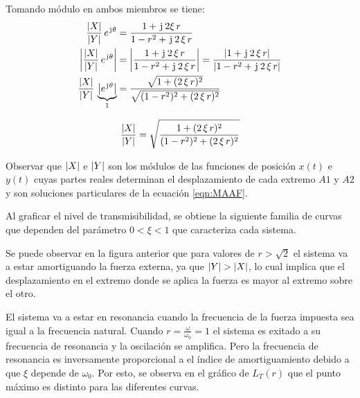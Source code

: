 Tomando módulo en ambos miembros se tiene:
\begin{align*}
    \frac{{\left| {X} \right|}}{{\left| {Y} \right|}} \, e^{\mkern2mu\mathrm{j}\mkern1mu\theta}
    &= \frac{1+ \mkern2mu\mathrm{j}\mkern1mu \, 2 \xi \, r}{1-r^2 + \mkern2mu\mathrm{j}\mkern1mu \, 2 \, \xi \, r}
    \\
    {\left| {\frac{{\left| {X} \right|}}{{\left| {Y} \right|}} \, e^{\mkern2mu\mathrm{j}\mkern1mu\theta}} \right|}
    &= {\left| {\frac{1+ \mkern2mu\mathrm{j}\mkern1mu \, 2 \, \xi \, r}{1-r^2 + \mkern2mu\mathrm{j}\mkern1mu \, 2 \, \xi \, r}} \right|}
    = \frac{{\left| {1 + \mkern2mu\mathrm{j}\mkern1mu \, 2 \, \xi \, r} \right|}}{{\left| {1-r^2 + \mkern2mu\mathrm{j}\mkern1mu \, 2 \, \xi \, r} \right|}}
    \\
    \frac{{\left| {X} \right|}}{{\left| {Y} \right|}} \, \underbrace{{\left| {e^{\mkern2mu\mathrm{j}\mkern1mu\theta}} \right|}}_1
    &= \frac{\sqrt{1 + (2 \, \xi \, r)^2}}{\sqrt{(1-r^2)^2 + (2 \, \xi \, r)^2}}
\end{align*}

\begin{mdframed}[style=PropertyFrame]
    \begin{prop}
    \end{prop}
    \begin{equation*}
        \frac{{\left| {X} \right|}}{{\left| {Y} \right|}} = \sqrt{\frac{1 + (2 \, \xi \, r)^2}{(1-r^2)^2 + (2 \, \xi \, r)^2}}
    \end{equation*}
\end{mdframed}

Observar que ${\left| {X} \right|}$ e ${\left| {Y} \right|}$ son los módulos de las funciones de posición $x(t)$ e $y(t)$ cuyas partes reales determinan el desplazamiento de cada extremo $A1$ y $A2$ y son soluciones particulares de la ecuación \ref{eqn:MAAF}.

Al graficar el nivel de transmisibilidad, se obtiene la siguiente familia de curvas que dependen del parámetro $0<\xi<1$ que caracteriza cada sistema.

\begin{center}
    \def\svgwidth{\linewidth}
    
\end{center}

Se puede observar en la figura anterior que para valores de $r>\sqrt{2}$ el sistema va a estar amortiguando la fuerza externa, ya que ${\left| {Y} \right|}>{\left| {X} \right|}$, lo cual implica que el desplazamiento en el extremo donde se aplica la fuerza es mayor al extremo sobre el otro.

El sistema va a estar en resonancia cuando la frecuencia de la fuerza impuesta sea igual a la frecuencia natural.
Cuando $r=\frac{\omega}{\omega_0}=1$ el sistema es exitado a su frecuencia de resonancia y la oscilación se amplifica.
Pero la frecuencia de resonancia es inversamente proporcional a el índice de amortiguamiento debido a que $\xi$ depende de $\omega_0$.
Por esto, se observa en el gráfico de $L_T(r)$ que el punto máximo es distinto para las diferentes curvas.


